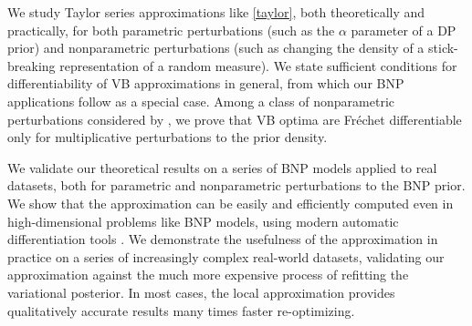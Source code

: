 We study Taylor series approximations like \eqref{taylor}, both theoretically
and practically, for both parametric perturbations (such as the $\alpha$
parameter of a DP prior) and nonparametric perturbations (such as changing
the density of a stick-breaking representation of a random measure).
We state sufficient conditions for differentiability of VB approximations
in general, from which our BNP applications follow as a special case.
Among a class of nonparametric perturbations considered by
\citet{gustafson:1996:local}, we prove that VB optima are Fr{\'e}chet
differentiable only for multiplicative perturbations to the prior density.

We validate our theoretical results on a series of BNP models applied to real
datasets, both for parametric and nonparametric perturbations to the BNP prior.
We show that the approximation can be easily and efficiently computed even in
high-dimensional problems like BNP models, using modern automatic
differentiation tools \citep{baydin:2018:automatic, jax2018github}. We
demonstrate the usefulness of the approximation in practice on a series of
increasingly complex real-world datasets, validating our approximation against
the much more expensive process of refitting the variational posterior.   In
most cases, the local approximation provides qualitatively accurate results many
times faster re-optimizing.
